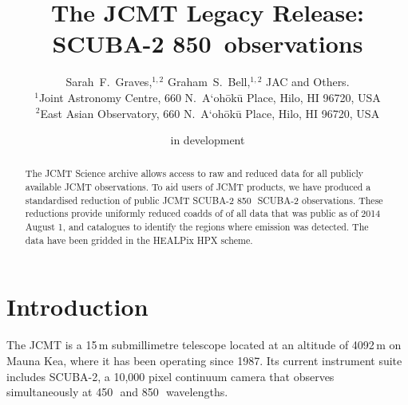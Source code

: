 \documentclass[usenatbib]{mn2e}
\title[SCUBA-2 850\um\ Legacy Release]%
{The JCMT Legacy Release: SCUBA-2 850\bmicron\ observations}
\author[S.~F.~Graves et~al.]
{Sarah~F.~Graves,$^{1,2}$
Graham~S.~Bell,$^{1,2}$
JAC
and
Others.\\
$^1$Joint Astronomy Centre, 660 N.\ A`oh\=ok\=u Place, Hilo, HI 96720, USA\\
$^2$East Asian Observatory, 660 N.\ A`oh\=ok\=u Place, Hilo, HI 96720, USA
}
\newcommand{\um}{\micron}
\begin{document}
\date{in development}

\pagerange{\pageref{firstpage}--\pageref{lastpage}} 

\maketitle

\label{firstpage}

\begin{abstract}
  The JCMT Science archive allows access to raw and reduced data for
  all publicly available JCMT observations. To aid users of JCMT
  products, we have produced a standardised reduction of public JCMT
  SCUBA-2 850\,\um\ SCUBA-2 observations. These reductions provide
  uniformly reduced coadds of of all data that was public as of 2014 August
  1, and catalogues to identify the regions where emission was
  detected. The data have been gridded in the HEALPix HPX scheme.
\end{abstract}

\section{Introduction}

The JCMT is a 15\,m submillimetre telescope located at an altitude of
4092\,m on Mauna Kea, where it has been operating since
1987. Its current instrument suite includes SCUBA-2, a 10,000
pixel continuum camera that observes simultaneously at 450\,\um\ and
850\,\um\ wavelengths\citep{Holland2013}.
\end{document}
